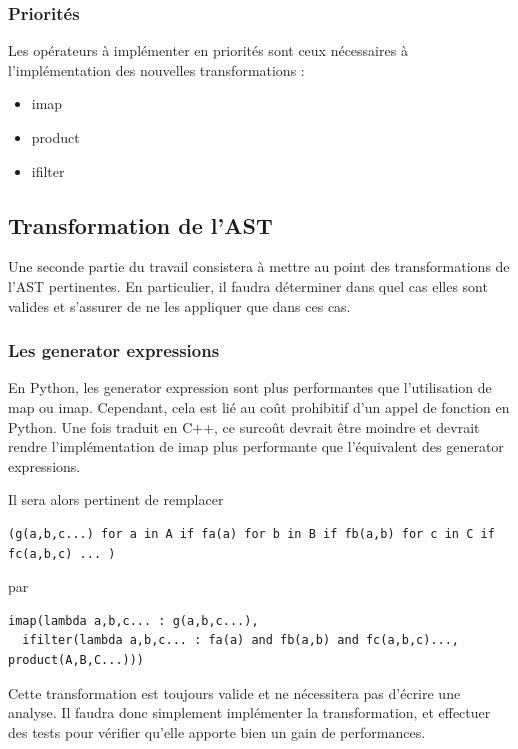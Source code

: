 \documentclass[a4paper]{article}
\begin{document}
\subsubsection{Priorités}

Les opérateurs à implémenter en priorités sont ceux nécessaires à
l'implémentation des nouvelles transformations :

\begin{itemize}
  \item imap
  \item product
  \item ifilter
\end{itemize}


\subsection{Transformation de l'AST}

Une seconde partie du travail consistera à mettre au point des
transformations de l'AST pertinentes. En particulier, il faudra
déterminer dans quel cas elles sont valides et s'assurer de ne les
appliquer que dans ces cas.

\subsubsection{Les generator expressions}

En Python, les generator expression sont plus performantes que
l'utilisation de map ou imap. Cependant, cela est lié au coût
prohibitif d'un appel de fonction en Python. Une fois traduit en C++,
ce surcoût devrait être moindre et devrait rendre l'implémentation de
imap plus performante que l'équivalent des generator expressions.

Il sera alors pertinent de remplacer

\begin{verbatim}
(g(a,b,c...) for a in A if fa(a) for b in B if fb(a,b) for c in C if fc(a,b,c) ... )
\end{verbatim}
 
par

\begin{verbatim}
imap(lambda a,b,c... : g(a,b,c...), 
  ifilter(lambda a,b,c... : fa(a) and fb(a,b) and fc(a,b,c)..., product(A,B,C...)))
\end{verbatim}

Cette transformation est toujours valide et ne nécessitera pas
d'écrire une analyse. Il faudra donc simplement implémenter la
transformation, et effectuer des tests pour vérifier qu'elle apporte
bien un gain de performances.
\end{document}
